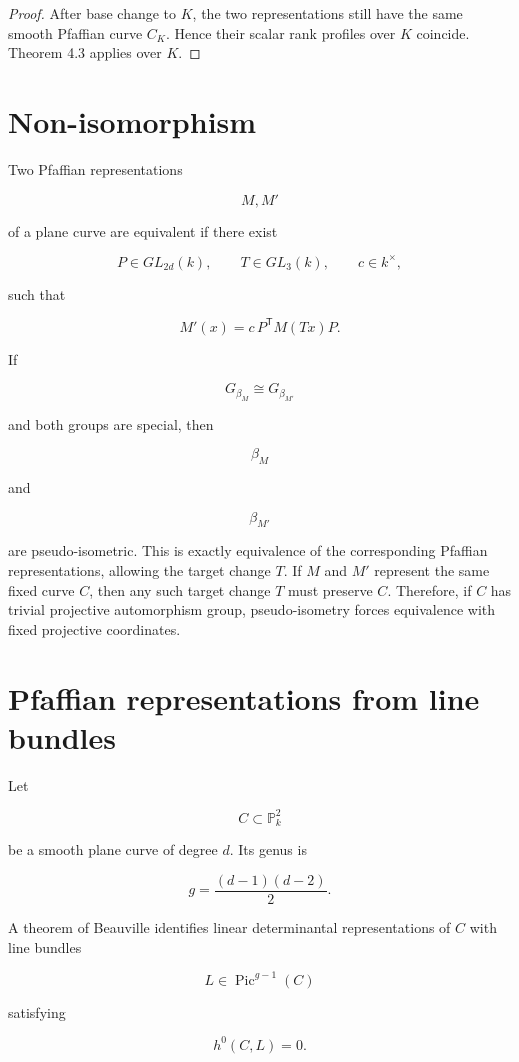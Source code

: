 \documentclass[11pt]{article}
\begin{document}
\begin{proof}
After base change to $K$, the two representations still have the same smooth Pfaffian curve $C_K$. Hence their scalar rank profiles over $K$ coincide. Theorem 4.3 applies over $K$.

\end{proof}

\section{Non-isomorphism}

Two Pfaffian representations

\[
M,M'
\]

of a plane curve are equivalent if there exist

\[
P\in GL_{2d}(k),
\qquad
T\in GL_3(k),
\qquad
c\in k^\times,
\]

such that

\[
M'(x)=c\,P^{\mathsf T}M(Tx)P.
\]

If

\[
G_{\beta_M}\cong G_{\beta_{M'}}
\]

and both groups are special, then

\[
\beta_M
\]

and

\[
\beta_{M'}
\]

are pseudo-isometric. This is exactly equivalence of the corresponding Pfaffian representations, allowing the target change $T$. If $M$ and $M'$ represent the same fixed curve $C$, then any such target change $T$ must preserve $C$. Therefore, if $C$ has trivial projective automorphism group, pseudo-isometry forces equivalence with fixed projective coordinates.

\section{Pfaffian representations from line bundles}

Let

\[
C\subset\mathbb P^2_k
\]

be a smooth plane curve of degree $d$. Its genus is

\[
g=\frac{(d-1)(d-2)}2.
\]

A theorem of Beauville identifies linear determinantal representations of $C$ with line bundles

\[
L\in\operatorname{Pic}^{g-1}(C)
\]

satisfying

\[
h^0(C,L)=0.
\]
\end{document}
